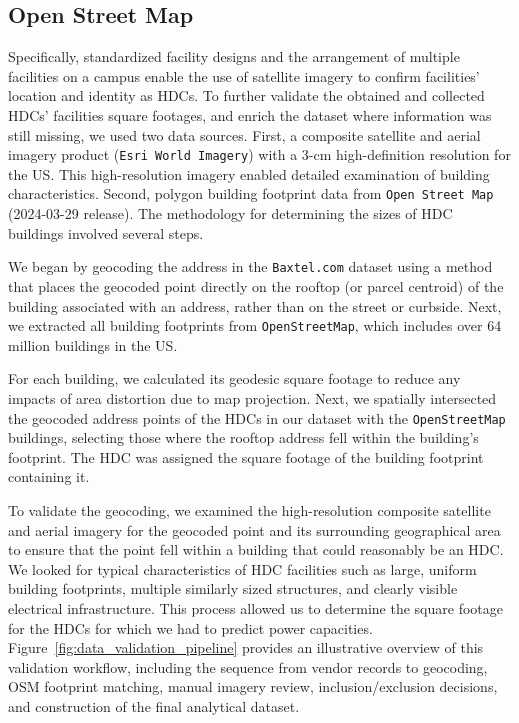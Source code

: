 \documentclass[12pt]{article}
\begin{document}
\subsection{Open Street Map}\label{sm:osm}

Specifically, standardized facility designs and the arrangement of multiple facilities on a campus enable the use of satellite imagery to confirm facilities' location and identity as HDCs. To further validate the obtained and collected HDCs' facilities square footages, and enrich the dataset where information was still missing, we used two data sources. First, a composite satellite and aerial imagery product (\texttt{Esri World Imagery}) with a 3-cm high-definition resolution for the US. This high-resolution imagery enabled detailed examination of building characteristics. Second, polygon building footprint data from \texttt{Open Street Map} (2024-03-29 release). The methodology for determining the sizes of HDC buildings involved several steps. 
    
We began by geocoding the address in the \texttt{Baxtel.com} dataset using a method that places the geocoded point directly on the rooftop (or parcel centroid) of the building associated with an address, rather than on the street or curbside. Next, we extracted all building footprints from \texttt{OpenStreetMap}, which includes over 64 million buildings in the US. 
    
For each building, we calculated its geodesic square footage to reduce any impacts of area distortion due to map projection. Next, we spatially intersected the geocoded address points of the HDCs in our dataset with the \texttt{OpenStreetMap} buildings, selecting those where the rooftop address fell within the building’s footprint. The HDC was assigned the square footage of the building footprint containing it. 
    
To validate the geocoding, we examined the high-resolution composite satellite and aerial imagery for the geocoded point and its surrounding geographical area to ensure that the point fell within a building that could reasonably be an HDC. We looked for typical characteristics of HDC facilities such as large, uniform building footprints, multiple similarly sized structures, and clearly visible electrical infrastructure. This process allowed us to determine the square footage for the HDCs for which we had to predict power capacities. 
Figure~\ref{fig:data_validation_pipeline} provides an illustrative overview of this validation workflow, including the sequence from vendor records to geocoding, OSM footprint matching, manual imagery review, inclusion/exclusion decisions, and construction of the final analytical dataset.
    
\end{document}
